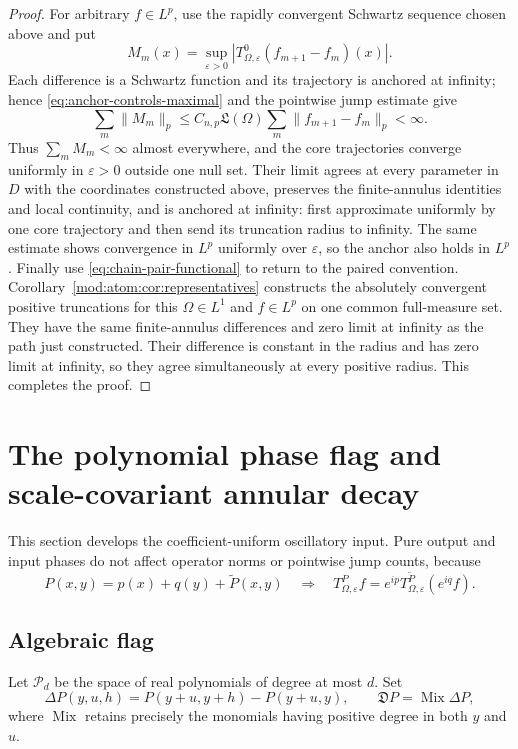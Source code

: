 \documentclass[11pt]{article}
\numberwithin{equation}{section}
\theoremstyle{remark}
\theoremstyle{definition}
\newcommand{\Mix}{\operatorname{Mix}}
\newcommand{\Dop}{\mathfrak D}
\begin{document}
\begin{proof}
For arbitrary $f\in L^p$, use the rapidly convergent Schwartz sequence
chosen above and put
\[
 M_m(x)=\sup_{\varepsilon>0}
 |T^0_{\Omega,\varepsilon}(f_{m+1}-f_m)(x)|.
\]
Each difference is a Schwartz function and its trajectory is anchored at
infinity; hence \eqref{eq:anchor-controls-maximal} and the pointwise jump
estimate give
\[
 \sum_m\|M_m\|_p
 \le C_{n,p}\mathfrak L(\Omega)
       \sum_m\|f_{m+1}-f_m\|_p<\infty.
\]
Thus $\sum_mM_m<\infty$ almost everywhere, and the core trajectories
converge uniformly in $\varepsilon>0$ outside one null set.  Their limit
agrees at every parameter in $D$ with the coordinates constructed above,
preserves the finite-annulus identities and local continuity, and is
anchored at infinity: first approximate uniformly by one core trajectory
and then send its truncation radius to infinity.  The same estimate shows
convergence in $L^p$ uniformly over $\varepsilon$, so the anchor also
holds in $L^p$.  Finally use \eqref{eq:chain-pair-functional} to return to
the paired convention.
Corollary~\ref{mod:atom:cor:representatives} constructs the absolutely
convergent positive truncations for this $\Omega\in L^1$ and
$f\in L^p$ on one common full-measure set. They have the same
finite-annulus differences and zero limit at infinity as the path just
constructed. Their difference is constant in the radius and has zero
limit at infinity, so they agree simultaneously at every positive radius.
This completes the proof.
\end{proof}

\section{The polynomial phase flag and scale-covariant annular decay}
\label{sec:flag}

This section develops the coefficient-uniform oscillatory input.  Pure
output and input phases do not affect operator norms or pointwise jump
counts, because
\begin{equation}\label{eq:purephase}
 P(x,y)=p(x)+q(y)+\widetilde P(x,y)
 \quad\Longrightarrow\quad
 T^P_{\Omega,\varepsilon}f=e^{ip}
 T^{\widetilde P}_{\Omega,\varepsilon}(e^{iq}f).
\end{equation}

\subsection{Algebraic flag}

Let $\mathcal P_d$ be the space of real polynomials of degree at most $d$.
Set
\[
 \Delta P(y,u,h)=P(y+u,y+h)-P(y+u,y),\qquad
 \Dop P=\Mix\Delta P,
\]
where $\Mix$ retains precisely the monomials having positive degree in both
$y$ and $u$.
\end{document}
